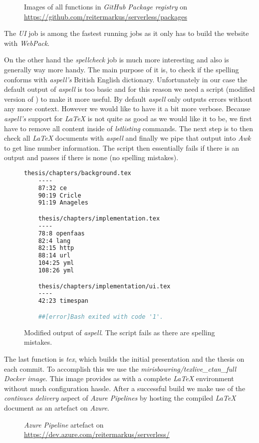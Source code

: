 \begin{figure}[H]
  \centering
  \caption{Images of all functions in \textit{GitHub Package registry} on \url{https://github.com/reitermarkus/serverless/packages}}
\end{figure}

The \textit{UI} job is among the fastest running jobs as it only has to build the website with
\textit{WebPack}.

On the other hand the \textit{spellcheck} job is much more interesting and also is generally way
more handy. The main purpose of it is, to check if the spelling conforms with \textit{aspell's}
British English dictionary. Unfortunately in our case the default output of \textit{aspell} is too
basic and for this reason we need a script (modified version of \cite{aspell-awk}) to make it more
useful. By default \textit{aspell} only outputs errors without any more context. However we would
like to have it a bit more verbose. Because \textit{aspell's} support for \textit{LaTeX} is not
quite as good as we would like it to be, we first have to remove all content inside of
\textit{lstlisting} commands. The next step is to then check all \textit{LaTeX} documents with
\textit{aspell} and finally we pipe that output into \textit{Awk} to get line number information.
The script then essentially fails if there is an output and passes if there is none (no spelling
mistakes).

\begin{figure}[H]
  \begin{lstlisting}[language=bash, basicstyle=\small\ttfamily]
    thesis/chapters/background.tex
    ----
    87:32 ce
    90:19 Cricle
    91:19 Anageles

    thesis/chapters/implementation.tex
    ----
    78:8 openfaas
    82:4 lang
    82:15 http
    88:14 url
    104:25 yml
    108:26 yml

    thesis/chapters/implementation/ui.tex
    ----
    42:23 timespan

    ##[error]Bash exited with code '1'.
  \end{lstlisting}
  \caption{Modified output of \textit{aspell}. The script fails as there are spelling mistakes.}
\end{figure}

The last function is \textit{tex}, which builds the initial presentation and the thesis on each
commit. To accomplish this we use the \textit{mirisbowring/texlive\_ctan\_full Docker image}. This
image provides as with a complete \textit{LaTeX} environment without much configuration hassle.
After a successful build we make use of the \textit{continues delivery} aspect of \textit{Azure
Pipelines} by hosting the compiled \textit{LaTeX} document as an artefact on \textit{Azure}.

\begin{figure}[H]
  \centering
  \caption{\textit{Azure Pipeline} artefact on \url{https://dev.azure.com/reitermarkus/serverless/}}
\end{figure}
